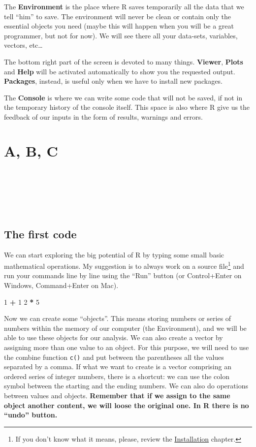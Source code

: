 \documentclass[
]{article}
\newenvironment{Shaded}{\begin{snugshade}}{\end{snugshade}}
\newcommand{\DecValTok}[1]{\textcolor[rgb]{0.00,0.00,0.81}{#1}}
\newcommand{\SpecialCharTok}[1]{\textcolor[rgb]{0.81,0.36,0.00}{\textbf{#1}}}
\begin{document}
The \textbf{Environment} is the place where R saves temporarily all the data
that we tell ``him'' to save. The environment will never be clean or
contain only the essential objects you need (maybe this will happen when
you will be a great programmer, but not for now). We will see there all
your data-sets, variables, vectors, etc\ldots{}

The bottom right part of the screen is devoted to many things.
\textbf{Viewer}, \textbf{Plots} and \textbf{Help} will be activated automatically to
show you the requested output. \textbf{Packages}, instead, is useful only
when we have to install new packages.

The \textbf{Console} is where we can write some code that will not be saved,
if not in the temporary history of the console itself. This space is
also where R give us the feedback of our inputs in the form of results,
warnings and errors.

\newpage

\hypertarget{a-b-c}{%
\section{A, B, C}\label{a-b-c}}

~

~

~

\hypertarget{the-first-code}{%
\subsection{The first code}\label{the-first-code}}

We can start exploring the big potential of R by typing some small basic
mathematical operations. My suggestion is to always work on a source
file\footnote{If you don't know what it means, please, review the \protect\hyperlink{installation}{Installation}
  chapter.} and run your commands line by line using the ``Run'' button (or
Control+Enter on Windows, Command+Enter on Mac).

\begin{Shaded}
\begin{Highlighting}[]
\DecValTok{1} \SpecialCharTok{+} \DecValTok{1}
\DecValTok{2} \SpecialCharTok{*} \DecValTok{5}
\end{Highlighting}
\end{Shaded}

Now we can create some ``objects''. This means storing numbers or series
of numbers within the memory of our computer (the Environment), and we
will be able to use these objects for our analysis. We can also create a
vector by assigning more than one value to an object. For this purpose,
we will need to use the combine function \texttt{c()} and put between the
parentheses all the values separated by a comma. If what we want to
create is a vector comprising an ordered series of integer numbers,
there is a shortcut: we can use the colon symbol between the starting
and the ending numbers. We can also do operations between values and
objects. \textbf{Remember that if we assign to the same object another
content, we will loose the original one. In R there is no ``undo''
button.}
\end{document}
